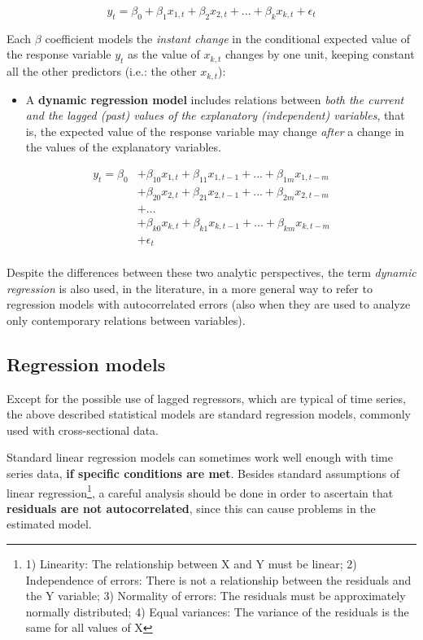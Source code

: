 \documentclass[
]{article}
\providecommand{\tightlist}{%
  \setlength{\itemsep}{0pt}\setlength{\parskip}{0pt}}
\begin{document}
\[
y_t = \beta_0 + \beta_1x_{1,t} + \beta_2x_{2,t} + ... + \beta_kx_{k,t} + \epsilon_t
\]

Each \(\beta\) coefficient models the \emph{instant change} in the conditional expected value of the response variable \(y_t\) as the value of \(x_{k,t}\) changes by one unit, keeping constant all the other predictors (i.e.: the other \(x_{k,t}\)):

\begin{itemize}
\tightlist
\item
  A \textbf{dynamic regression model} includes relations between \emph{both the current and the lagged (past) values of the explanatory (independent) variables}, that is, the expected value of the response variable may change \emph{after} a change in the values of the explanatory variables.
\end{itemize}

\[
\begin{aligned} 
y_t = \beta_0  & + \beta_{10}x_{1,t} + \beta_{11}x_{1,t-1} + ... + \beta_{1m}x_{1,t-m} \\
& + \beta_{20}x_{2,t} + \beta_{21}x_{2,t-1} + ... + \beta_{2m}x_{2,t-m} \\
& + \dots \\
& + \beta_{k0}x_{k,t} + \beta_{k1}x_{k,t-1} + ... + \beta_{km}x_{k,t-m} \\
& + \epsilon_t \\
\end{aligned} 
\]

Despite the differences between these two analytic perspectives, the term \emph{dynamic regression} is also used, in the literature, in a more general way to refer to regression models with autocorrelated errors (also when they are used to analyze only contemporary relations between variables).

\subsection{Regression models}\label{regression-models}

Except for the possible use of lagged regressors, which are typical of time series, the above described statistical models are standard regression models, commonly used with cross-sectional data.

Standard linear regression models can sometimes work well enough with time series data, \textbf{if specific conditions are met}. Besides standard assumptions of linear regression\footnote{1) Linearity: The relationship between X and Y must be linear; 2) Independence of errors: There is not a relationship between the residuals and the Y variable; 3) Normality of errors: The residuals must be approximately normally distributed; 4) Equal variances: The variance of the residuals is the same for all values of X}, a careful analysis should be done in order to ascertain that \textbf{residuals are not autocorrelated}, since this can cause problems in the estimated model.
\end{document}
